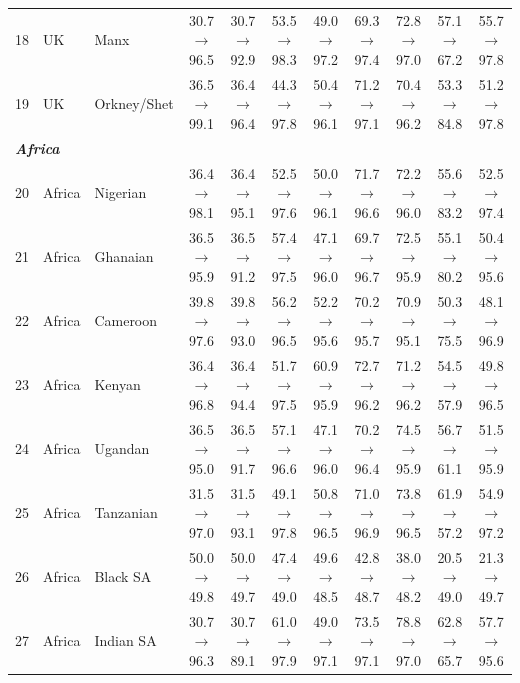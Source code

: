 \begin{table}[t]
{\begin{tabular}{rll c c c c c c c c}
18 & UK & Manx & 30.7$\rightarrow$96.5 & 30.7$\rightarrow$92.9 & 53.5$\rightarrow$98.3 & 49.0$\rightarrow$97.2 & 69.3$\rightarrow$97.4 & 72.8$\rightarrow$97.0 & 57.1$\rightarrow$67.2 & 55.7$\rightarrow$97.8 \\
19 & UK & Orkney/Shet & 36.5$\rightarrow$99.1 & 36.4$\rightarrow$96.4 & 44.3$\rightarrow$97.8 & 50.4$\rightarrow$96.1 & 71.2$\rightarrow$97.1 & 70.4$\rightarrow$96.2 & 53.3$\rightarrow$84.8 & 51.2$\rightarrow$97.8 \\
\midrule
\multicolumn{11}{l}{\textit{\textbf{Africa}}} \\
20 & Africa & Nigerian & 36.4$\rightarrow$98.1 & 36.4$\rightarrow$95.1 & 52.5$\rightarrow$97.6 & 50.0$\rightarrow$96.1 & 71.7$\rightarrow$96.6 & 72.2$\rightarrow$96.0 & 55.6$\rightarrow$83.2 & 52.5$\rightarrow$97.4 \\
21 & Africa & Ghanaian & 36.5$\rightarrow$95.9 & 36.5$\rightarrow$91.2 & 57.4$\rightarrow$97.5 & 47.1$\rightarrow$96.0 & 69.7$\rightarrow$96.7 & 72.5$\rightarrow$95.9 & 55.1$\rightarrow$80.2 & 50.4$\rightarrow$95.6 \\
22 & Africa & Cameroon & 39.8$\rightarrow$97.6 & 39.8$\rightarrow$93.0 & 56.2$\rightarrow$96.5 & 52.2$\rightarrow$95.6 & 70.2$\rightarrow$95.7 & 70.9$\rightarrow$95.1 & 50.3$\rightarrow$75.5 & 48.1$\rightarrow$96.9 \\
23 & Africa & Kenyan & 36.4$\rightarrow$96.8 & 36.4$\rightarrow$94.4 & 51.7$\rightarrow$97.5 & 60.9$\rightarrow$95.9 & 72.7$\rightarrow$96.2 & 71.2$\rightarrow$96.2 & 54.5$\rightarrow$57.9 & 49.8$\rightarrow$96.5 \\
24 & Africa & Ugandan & 36.5$\rightarrow$95.0 & 36.5$\rightarrow$91.7 & 57.1$\rightarrow$96.6 & 47.1$\rightarrow$96.0 & 70.2$\rightarrow$96.4 & 74.5$\rightarrow$95.9 & 56.7$\rightarrow$61.1 & 51.5$\rightarrow$95.9 \\
25 & Africa & Tanzanian & 31.5$\rightarrow$97.0 & 31.5$\rightarrow$93.1 & 49.1$\rightarrow$97.8 & 50.8$\rightarrow$96.5 & 71.0$\rightarrow$96.9 & 73.8$\rightarrow$96.5 & 61.9$\rightarrow$57.2 & 54.9$\rightarrow$97.2 \\
26 & Africa & Black SA & 50.0$\rightarrow$49.8 & 50.0$\rightarrow$49.7 & 47.4$\rightarrow$49.0 & 49.6$\rightarrow$48.5 & 42.8$\rightarrow$48.7 & 38.0$\rightarrow$48.2 & 20.5$\rightarrow$49.0 & 21.3$\rightarrow$49.7 \\
27 & Africa & Indian SA & 30.7$\rightarrow$96.3 & 30.7$\rightarrow$89.1 & 61.0$\rightarrow$97.9 & 49.0$\rightarrow$97.1 & 73.5$\rightarrow$97.1 & 78.8$\rightarrow$97.0 & 62.8$\rightarrow$65.7 & 57.7$\rightarrow$95.6 \\

\end{tabular}}
\end{table}
